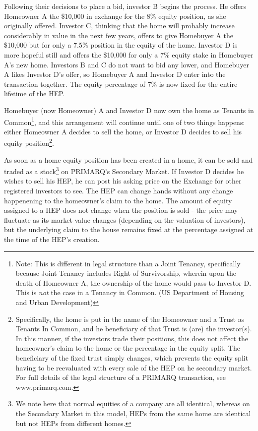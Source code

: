 \documentclass[twoside]{article}
\begin{document}
Following their decisions to place a bid, investor B begins the process. He offers Homeowner A the \$10,000 in exchange for the 8\% equity position, as she originally offered. Investor C, thinking that the home will probably increase considerably in value in the next few years, offers to give Homebuyer A the \$10,000 but for only a 7.5\% position in the equity of the home. Investor D is more hopeful still and offers the \$10,000 for only a 7\% equity stake in Homebuyer A's new home. Investors B and C do not want to bid any lower, and Homebuyer A likes Investor D's offer, so Homebuyer A and Investor D enter into the transaction together. The equity percentage  of 7\% is now fixed for the entire lifetime of the HEP.

Homebuyer (now Homeowner) A and Investor D now own the home as Tenants in Common\footnote{Note: This is different in legal structure than a Joint Tenancy, specifically because Joint Tenancy includes Right of Survivorship, wherein upon the death of Homeowner A, the ownership of the home would pass to Investor D. This is \textit{not} the case in a Tenancy in Common. (US Department of Housing and Urban Development)}, and this arrangement will continue until one of two things happens: either Homeowner A decides to sell the home, or Investor D decides to sell his equity position\footnote{Specifically, the home is put in the name of the Homeowner and a Trust as Tenants In Common, and he beneficiary of that Trust is (are) the investor(s). In this manner, if the investors trade their positions, this does not affect the homeowner's claim to the home or the percentage in the equity split. The beneficiary of the fixed trust simply changes, which prevents the equity split having to be reevaluated with every sale of the HEP on he secondary market. For full details of the legal structure of a PRIMARQ transaction, see www.primarq.com.}. 

As soon as a home equity position has been created in a home, it can be sold and traded as a stock\footnote{We note here that normal equities of a company are all identical, whereas on the Secondary Market in this model, HEPs from the same home are identical but not HEPs from different homes.} on PRIMARQ's Secondary Market. If Investor D decides he wishes to sell his HEP, he can post his asking price on the Exchange for other registered investors to see. The HEP can change hands without any change happenening to the homeowner's claim to the home. The amount of equity assigned to a HEP does not change when the position is sold - the price may fluctuate as its market value changes (depending on the valuation of investors), but the underlying claim to the house remains fixed at the percentage assigned at the time of the HEP's creation.
\end{document}
